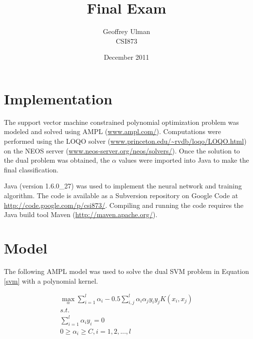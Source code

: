 \documentclass{article}
\begin{document}
\title{Final Exam}
\author{Geoffrey Ulman\\
        CSI873}
\date{December 2011}
\maketitle

\section{Implementation}\label{Implementation}

The support vector machine constrained polynomial optimization problem was modeled and solved using AMPL (\url{www.ampl.com/}). Computations were performed using the LOQO solver (\url{www.princeton.edu/~rvdb/loqo/LOQO.html}) on the NEOS server (\url{www.neos-server.org/neos/solvers/}). Once the solution to the dual problem was obtained, the \(\alpha\) values were imported into Java to make the final classification.

Java (version 1.6.0\_27) was used to implement the neural network and training algorithm. The code is available as a Subversion repository on Google Code at \url{http://code.google.com/p/csi873/}. Compiling and running the code requires the Java build tool Maven (\url{http://maven.apache.org/}).

\section{Model}\label{Model}

The following AMPL model was used to solve the dual SVM problem in Equation \ref{svm} with a polynomial kernel.

\begin{equation}\label{svm}
\begin{split}
\max_\alpha \sum_{i=1}^l \alpha_i - 0.5 \sum_{i,j}^l \alpha_i \alpha_j y_i y_j K \left( x_i , x_j \right) \\
s.t. \\
\sum_{i=1}^l \alpha_i y_i = 0 \\
0 \ge \alpha_i \ge C , i = 1,2,...,l
\end{split}
\end{equation}
\end{document}
